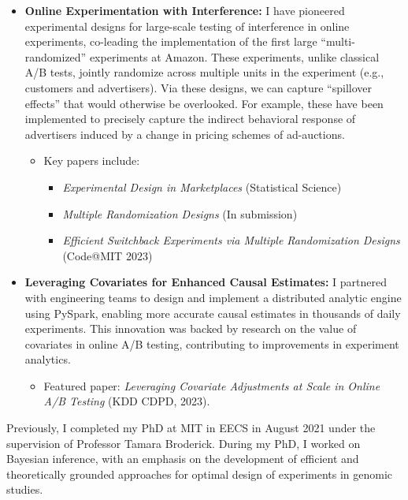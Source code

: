 \documentclass[10pt, a4paper]{article}
\begin{document}
\begin{itemize}
    \item \textbf{Online Experimentation with Interference:} 
    I have pioneered experimental designs for large-scale testing of interference in online experiments, co-leading the implementation of the first large ``multi-randomized'' experiments at Amazon. These experiments, unlike classical A/B tests, jointly randomize across multiple units in the experiment (e.g., customers and advertisers). Via these designs, we can capture ``spillover effects'' that would otherwise be overlooked. For example, these have been implemented to precisely capture the indirect behavioral response of advertisers induced by a change in pricing schemes of ad-auctions.
    \begin{itemize}
        \item Key papers include: 
        \begin{itemize}
            \item \emph{Experimental Design in Marketplaces} (Statistical Science)
            \item \emph{Multiple Randomization Designs} (In submission)
            \item \emph{Efficient Switchback Experiments via Multiple Randomization Designs} (Code@MIT 2023)
        \end{itemize}
    \end{itemize}
    
    \item \textbf{Leveraging Covariates for Enhanced Causal Estimates:}
    I partnered with engineering teams to design and implement a distributed analytic engine using PySpark, enabling more accurate causal estimates in thousands of daily experiments. This innovation was backed by research on the value of covariates in online A/B testing, contributing to improvements in experiment analytics.
    \begin{itemize}
        \item Featured paper: \emph{Leveraging Covariate Adjustments at Scale in Online A/B Testing} (KDD CDPD, 2023).
    \end{itemize}
\end{itemize}

Previously, I completed my PhD at MIT in EECS in August 2021 under the supervision of Professor Tamara Broderick. 
During my PhD, I worked on Bayesian inference, with an emphasis on the development of efficient and theoretically grounded approaches for optimal design of experiments in genomic studies.
%
\end{document}
